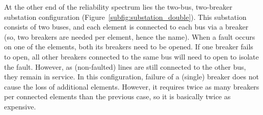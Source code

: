 At the other end of the reliability spectrum lies the two-bus, two-breaker substation configuration (Figure~\ref{subfig:substation_double}). This substation consists of two buses, and each element is connected to each bus via a breaker (so, two breakers are needed per element, hence the name). When a fault occurs on one of the elements, both its breakers need to be opened. If one breaker fails to open, all other breakers connected to the same bus will need to open to isolate the fault. However, as (non-faulted) lines are still connected to the other bus, they remain in service. In this configuration, failure of a (single) breaker does not cause the loss of additional elements. However, it requires twice as many breakers per connected elements than the previous case, so it is basically twice as expensive.

\begin{figure}
    \centering
     \hfill
     \\  \baselineskip
\end{figure}
